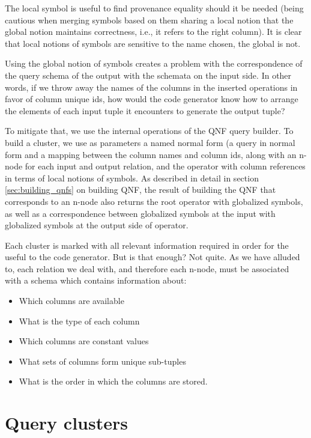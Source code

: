 The local symbol is useful to find provenance equality
should it be needed (being cautious when merging symbols based
on them sharing a local notion that the global notion maintains
correctness, i.e., it refers to the right column). It is clear that
local notions of symbols are sensitive to the name chosen, the
global is not.

Using the global notion of symbols creates a problem with the
correspondence of the query schema of the output with the schemata on
the input side. In other words, if we throw away the names of the
columns in the inserted operations in favor of column unique ids, how would the
code generator know how to arrange the elements of each input tuple
it encounters to generate the output tuple?

To mitigate that, we use the internal operations of the QNF query builder. 
To build a cluster, we use as parameters a named normal form (a query in normal form and a
mapping between the column names and column ids, along with an n-node for each input
and output relation, and the operator with column references in terms
of local notions of symbols. As described in detail in section \ref{sec:building_qnfs} on building QNF,
the result of building the QNF that corresponds to an n-node also
returns the root operator with globalized symbols, as well as a correspondence
between globalized symbols at the input with globalized symbols at the
output side of operator.

Each cluster is marked with all  relevant information
required in order for the useful to the code generator. But is that
enough? Not quite. As we have alluded to, each relation we deal
with, and therefore each n-node, must be associated with a schema
which contains information about:

\begin{itemize}
\item Which columns are available
\item What is the type of each column
\item Which columns are constant values
\item What sets of columns form unique sub-tuples
\item What is the order in which the columns are stored.
\end{itemize}

\section{Query clusters}

